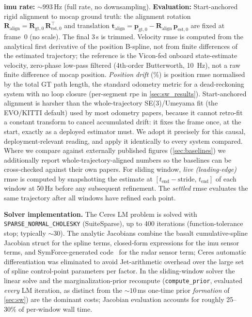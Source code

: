\textbf{\ac{imu} rate:} $\sim$993\,Hz (full rate, no downsampling).
\textbf{Evaluation:} Start-anchored rigid alignment to \ac{mocap} ground
truth: the alignment rotation $\mathbf{R}_\mathrm{align} =
\mathbf{R}_{\mathrm{gt},0}\,\mathbf{R}_{\mathrm{est},0}^\top$
and translation $\mathbf{t}_\mathrm{align} =
\mathbf{p}_{\mathrm{gt},0} - \mathbf{R}_\mathrm{align}\,
\mathbf{p}_{\mathrm{est},0}$ are fixed at frame~0 (no scale).
The final 3\,s is trimmed.  Velocity \ac{rmse} is computed from the
analytical first derivative of the position B-spline, not from finite
differences of the estimated trajectory; the reference is the Vicon-fed
onboard state-estimate velocity, zero-phase low-pass filtered (4th-order
Butterworth, \SI{10}{\hertz}), not a raw finite difference of \ac{mocap}
position.
\emph{Position drift} (\%) is position \ac{rmse} normalised by the total
GT path length, the standard odometry metric for a
dead-reckoning system with no loop closure (per-segment \ac{rpe} in
\autoref{sec:sw_results}).
Start-anchored alignment is harsher than the whole-trajectory
SE(3)/Umeyama fit (the EVO/KITTI default) used by most odometry papers,
because it cannot retro-fit a constant transform to cancel accumulated
drift: it fixes the frame once, at the start, exactly as a deployed
estimator must.  We adopt it precisely for this causal,
deployment-relevant reading, and apply it identically to every system
compared.  Where we compare against externally published figures
(\autoref{sec:baselines}) we additionally report whole-trajectory-aligned
numbers so the baselines can be cross-checked against their own papers.
For sliding window, \emph{live (leading-edge)} \ac{rmse} is computed by
snapshotting the estimate at $[t_\text{end}{-}\text{stride},\, t_\text{end}]$
of each window at 50\,Hz before any subsequent refinement.  The
\emph{settled} \ac{rmse} evaluates the same trajectory after all windows
have refined each point.

\textbf{Solver implementation.}
The Ceres LM problem is solved with \texttt{SPARSE\_NORMAL\_CHOLESKY}
(SuiteSparse), up to 400 iterations (function-tolerance stop;
typically ${\sim}30$).
The analytic Jacobians combine the basalt cumulative-spline
Jacobian struct for the spline terms, closed-form expressions for the
\ac{imu} sensor terms, and SymForce-generated code~\cite{martiros2022symforce}
for the radar sensor term; Ceres automatic differentiation was
eliminated to avoid Jet-arithmetic overhead over the large set of
spline control-point parameters per factor.
In the sliding-window solver the linear solve and the
marginalization-prior recompute (\texttt{compute\_prior}, evaluated
\emph{every} LM iteration, as distinct from the ${\sim}10$\,ms one-time
prior \emph{formation} of \autoref{sec:sw}) are the dominant costs;
Jacobian evaluation accounts for roughly 25--30\% of per-window wall time.
